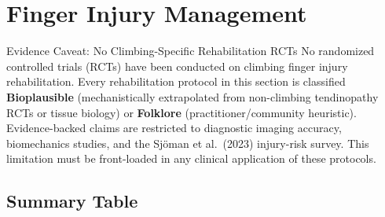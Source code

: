\section{Finger Injury Management}
\label{sec:injury}

\begin{warningbox}{Evidence Caveat: No Climbing-Specific Rehabilitation RCTs}
No randomized controlled trials (RCTs) have been conducted on climbing finger injury rehabilitation. Every rehabilitation protocol in this section is classified \textbf{Bioplausible} (mechanistically extrapolated from non-climbing tendinopathy RCTs or tissue biology) or \textbf{Folklore} (practitioner/community heuristic). Evidence-backed claims are restricted to diagnostic imaging accuracy, biomechanics studies, and the Sjöman et al.\ (2023) injury-risk survey. This limitation must be front-loaded in any clinical application of these protocols.
\end{warningbox}

\subsection*{Summary Table}

